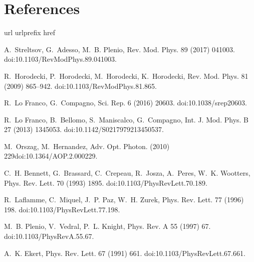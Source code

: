 \documentclass[twocolumn,3p,times]{elsarticle}
\begin{document}
\section*{References}

\begin{thebibliography}{10}
\expandafter\ifx\csname url\endcsname\relax
  \def\url#1{\texttt{#1}}\fi
\expandafter\ifx\csname urlprefix\endcsname\relax\def\urlprefix{URL }\fi
\expandafter\ifx\csname href\endcsname\relax
  \def\href#1#2{#2} \def\path#1{#1}\fi

A.~Streltsov, G.~Adesso, M.~B. Plenio, Rev. Mod. Phys. 89 (2017) 041003.
\newblock \href {http://dx.doi.org/10.1103/RevModPhys.89.041003}
  {\path{doi:10.1103/RevModPhys.89.041003}}.

R.~Horodecki, P.~Horodecki, M.~Horodecki, K.~Horodecki, Rev. Mod. Phys. 81
  (2009) 865--942.
\newblock \href {http://dx.doi.org/10.1103/RevModPhys.81.865}
  {\path{doi:10.1103/RevModPhys.81.865}}.

R.~{Lo Franco}, G.~Compagno, Sci. Rep. 6 (2016) 20603.
\newblock \href {http://dx.doi.org/10.1038/srep20603}
  {\path{doi:10.1038/srep20603}}.

R.~{Lo Franco}, B.~Bellomo, S.~Maniscalco, G.~Compagno, Int. J. Mod. Phys. B 27
  (2013) 1345053.
\newblock \href {http://dx.doi.org/10.1142/S0217979213450537}
  {\path{doi:10.1142/S0217979213450537}}.

M.~Orszag, M.~Hernandez, Adv. Opt. Photon. (2010) 229\href
  {http://dx.doi.org/10.1364/AOP.2.000229} {\path{doi:10.1364/AOP.2.000229}}.

C.~H. Bennett, G.~Brassard, C.~Crepeau, R.~Josza, A.~Peres, W.~K. Wootters,
  Phys. Rev. Lett. 70 (1993) 1895.
\newblock \href {http://dx.doi.org/10.1103/PhysRevLett.70.189}
  {\path{doi:10.1103/PhysRevLett.70.189}}.

R.~Laflamme, C.~Miquel, J.~P. Paz, W.~H. Zurek, Phys. Rev. Lett. 77 (1996) 198.
\newblock \href {http://dx.doi.org/10.1103/PhysRevLett.77.198}
  {\path{doi:10.1103/PhysRevLett.77.198}}.

M.~B. Plenio, V.~Vedral, P.~L. Knight, Phys. Rev. A 55 (1997) 67.
\newblock \href {http://dx.doi.org/10.1103/PhysRevA.55.67}
  {\path{doi:10.1103/PhysRevA.55.67}}.

A.~K. Ekert, Phys. Rev. Lett. 67 (1991) 661.
\newblock \href {http://dx.doi.org/10.1103/PhysRevLett.67.661}
  {\path{doi:10.1103/PhysRevLett.67.661}}.


\end{thebibliography}
\end{document}
